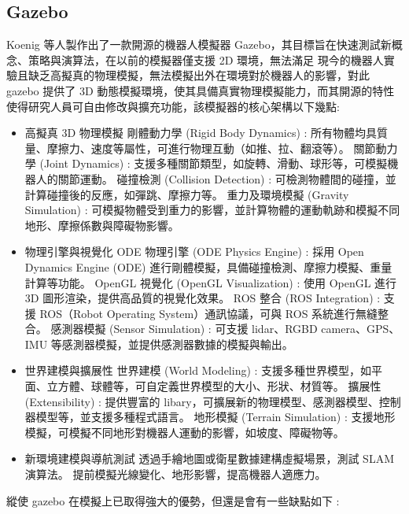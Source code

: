 \subsection{Gazebo}
Koenig 等人製作出了一款開源的機器人模擬器 Gazebo\cite{Koenig2004Gazebo}，其目標旨在快速測試新概念、策略與演算法，在以前的模擬器僅支援 2D 環境，無法滿足
現今的機器人實驗且缺乏高擬真的物理模擬，無法模擬出外在環境對於機器人的影響，對此 gazebo 提供了 3D 動態模擬環境，使其具備真實物理模擬能力，而其開源的特性
使得研究人員可自由修改與擴充功能，該模擬器的核心架構以下幾點:
\begin{itemize}
    \item 高擬真 3D 物理模擬
          \subitem 剛體動力學 (Rigid Body Dynamics) : 所有物體均具質量、摩擦力、速度等屬性，可進行物理互動（如推、拉、翻滾等）。
          \subitem 關節動力學 (Joint Dynamics) : 支援多種關節類型，如旋轉、滑動、球形等，可模擬機器人的關節運動。
          \subitem 碰撞檢測 (Collision Detection) : 可檢測物體間的碰撞，並計算碰撞後的反應，如彈跳、摩擦力等。
          \subitem 重力及環境模擬 (Gravity Simulation) : 可模擬物體受到重力的影響，並計算物體的運動軌跡和模擬不同地形、摩擦係數與障礙物影響。
    \item 物理引擎與視覺化
          \subitem ODE 物理引擎 (ODE Physics Engine) : 採用 Open Dynamics Engine (ODE) 進行剛體模擬，具備碰撞檢測、摩擦力模擬、重量計算等功能。
          \subitem OpenGL 視覺化 (OpenGL Visualization) : 使用 OpenGL 進行 3D 圖形渲染，提供高品質的視覺化效果。
          \subitem ROS 整合 (ROS Integration) : 支援 ROS（Robot Operating System）通訊協議，可與 ROS 系統進行無縫整合。
          \subitem 感測器模擬 (Sensor Simulation) :
          可支援 lidar、RGBD camera、GPS、IMU 等感測器模擬，並提供感測器數據的模擬與輸出。
    \item 世界建模與擴展性
          \subitem 世界建模 (World Modeling) : 支援多種世界模型，如平面、立方體、球體等，可自定義世界模型的大小、形狀、材質等。
          \subitem 擴展性 (Extensibility) : 提供豐富的 libary，可擴展新的物理模型、感測器模型、控制器模型等，並支援多種程式語言。
          \subitem 地形模擬 (Terrain Simulation) : 支援地形模擬，可模擬不同地形對機器人運動的影響，如坡度、障礙物等。
    \item 新環境建模與導航測試
          \subitem 透過手繪地圖或衛星數據建構虛擬場景，測試 SLAM 演算法。
          \subitem 提前模擬光線變化、地形影響，提高機器人適應力。
\end{itemize}
縱使 gazebo 在模擬上已取得強大的優勢，但還是會有一些缺點如下 :
